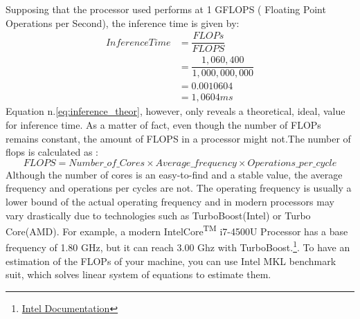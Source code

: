 Supposing that the processor used performs at 1 GFLOPS ( Floating Point Operations per Second), the inference time is given by:
\begin{equation}
    \begin{aligned}
InferenceTime &= \dfrac{FLOPs}{FLOPS} \\
          &= \dfrac{1,060,400}{1,000,000,000}\\
          &= 0.0010604\\
          &= 1,0604 ms
    \end{aligned}
    \label{eq:inference_theor}
\end{equation}
Equation n.\ref{eq:inference_theor}, however, only reveals a theoretical, ideal, value for inference time. As a matter of fact, even though the number of FLOPs remains constant, the amount of FLOPS in a processor might not.The number of flops is calculated as :
\begin{equation}
FLOPS = Number\_of\_Cores \times Average\_frequency \times Operations\_per\_cycle
\end{equation}
Although the number of cores is an easy-to-find and a stable value, the average frequency and operations per cycles are not. The operating frequency is usually a lower bound of the actual operating frequency and in modern processors may vary drastically due to technologies such as TurboBoost(Intel) or Turbo Core(AMD). For example, a modern Intel\textregistered Core\textsuperscript{TM}  i7-4500U Processor has a base frequency of 1.80 GHz, but it can reach 3.00 Ghz with TurboBoost.\footnote{
\href{https://ark.intel.com/content/www/us/en/ark/products/75460/intel-core-i74500u-processor-4m-cache-up-to-3-00-ghz.html}{Intel Documentation}}. 
To have an estimation of the FLOPs of your machine, you can use Intel MKL benchmark suit, which solves linear system of equations to estimate them. \cite{intel_bench_suite}

